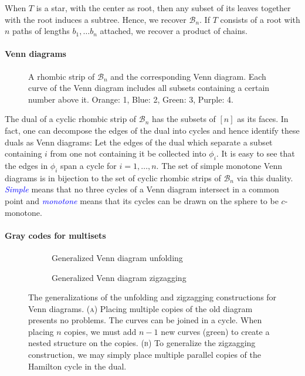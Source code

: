 \documentclass[fontsize=11pt,a4paper,DIV=12]{scrartcl}
\newcommand{\defn}[1]{\textsl{\textcolor{Blue}{#1}}}
\begin{document}
When $T$ is a star, with the center as root, then any subset of its leaves together with the root induces a subtree. Hence, we recover $\mathcal B_n$. If $T$ consists of a root with $n$ paths of lengths $b_1,\ldots b_n$ attached, we recover a product of chains.

\paragraph{Venn diagrams}
\begin{figure}
    \centering
    
    \caption{A rhombic strip of $\mathcal B_n$ and the corresponding Venn diagram. Each curve of the Venn diagram includes all subsets containing a certain number above it. Orange: 1, Blue: 2, Green: 3, Purple: 4.}
    \label{fig:Boolean4 venn}
\end{figure}
The dual of a cyclic rhombic strip of $\mathcal B_n$ has the subsets of $[n]$ as its faces. In fact, one can decompose the edges of the dual into cycles and hence identify these duals as Venn diagrams: Let the edges of the dual which separate a subset containing $i$ from one not containing it be collected into $\phi_i$. It is easy to see that the edges in $\phi_i$ span a cycle for $i=1,\ldots,n$. The set of simple monotone Venn diagrams is in bijection to the set of cyclic rhombic strips of $\mathcal B_n$ via this duality. \defn{Simple} means that no three cycles of a Venn diagram intersect in a common point and \defn{monotone} means that its cycles can be drawn on the sphere to be $c$-monotone.

\paragraph{Gray codes for multisets}
\begin{figure}[htbp]
    \centering
    \begin{subfigure}[b]{0.48\textwidth}
        \centering
        
        \caption{Generalized Venn diagram unfolding}
        \label{fig:venn unfolding generalized}
    \end{subfigure}
    \hfill
    \begin{subfigure}[b]{0.48\textwidth}
        \centering
        
        \caption{Generalized Venn diagram zigzagging}
        \label{fig:venn zigzagging generalized}
    \end{subfigure}
    
    \caption{The generalizations of the unfolding and zigzagging constructions for Venn diagrams. (\textsc{a}) Placing multiple copies of the old diagram presents no problems. The curves can be joined in a cycle. When placing $n$ copies, we must add $n-1$ new curves (green) to create a nested structure on the copies. (\textsc{b}) To generalize the zigzagging construction, we may simply place multiple parallel copies of the Hamilton cycle in the dual.}
    \label{fig:combined venn generalized}
\end{figure}
\end{document}
